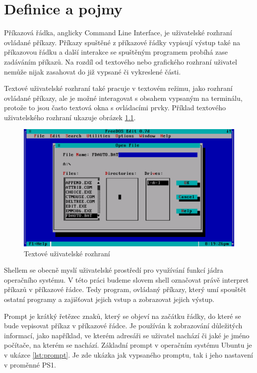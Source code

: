 \documentclass[thesis=M,czech]{FITthesis}[2012/06/26]
\begin{document}
\chapter{Definice a pojmy}

Příkazová řádka, anglicky Command Line Interface, je uživatelské rozhraní ovládané příkazy. Příkazy spuštěné z příkazové řádky vypisují výstup také na příkazovou řádku a další interakce se spuštěným programem probíhá zase zadáváním příkazů. Na rozdíl od textového nebo grafického rozhraní uživatel nemůže nijak zasahovat do již vypsané či vykreslené části.

Textové uživatelské rozhraní také pracuje v textovém režimu, jako rozhraní ovládané příkazy, ale je možné interagovat s obsahem vypsaným na terminálu, protože to jsou často textová okna s ovládacími prvky. Příklad textového uživatelského rozhraní ukazuje obrázek \ref{fig:tui}.

\begin{figure}
	\includegraphics[width=1.0\textwidth]{./images/TUI}
	\caption{Textové uživatelské rozhraní}
	\label{fig:tui}
\end{figure}

Shellem se obecně myslí uživatelské prostředí pro využívání funkcí jádra operačního systému. V této práci budeme slovem shell označovat právě interpret příkazů v příkazové řádce. Tedy program, ovládaný příkazy, který umí spouštět ostatní programy a zajišťovat jejich vstup a zobrazovat jejich výstup.


Prompt je krátký řetězec znaků, který se objeví na začátku řádky, do které se bude vepisovat příkaz v příkazové řádce. Je používán k zobrazování důležitých informací, jako například, ve kterém adresáři se uživatel nachází či jaké je jméno počítače, na kterém se nachází. Základní prompt v operačním systému Ubuntu je v ukázce \ref{lst:prompt}. Je zde ukázka jak vypsaného promptu, tak i jeho nastavení v proměnné PS1.
\end{document}
